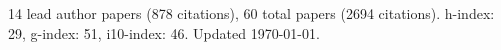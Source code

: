 14 lead author papers (878 citations),
60 total papers (2694 citations).\newline
h-index: 29, g-index: 51, i10-index: 46. Updated \today.